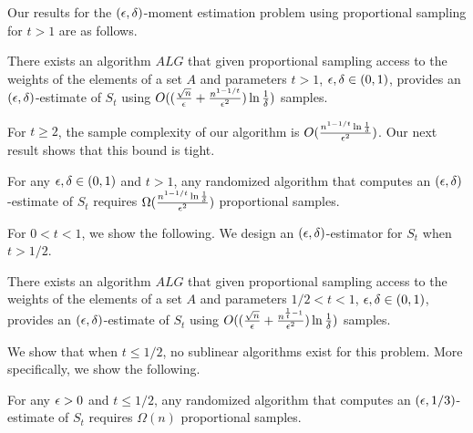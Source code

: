 Our results for the $(\epsilon,\delta)$-moment estimation problem using proportional sampling for $t>1$ are as follows. 

\begin{thm} There exists an algorithm $ALG$ that given proportional sampling access to the weights of the elements of a set $A$ and parameters $t>1$, $\epsilon,\delta\in (0,1)$, provides an $(\epsilon,\delta)$-estimate of $S_t$ using $O((\frac{\sqrt{n}}{\epsilon}+\frac{n^{1-1/t}}{\epsilon^2}) \ln\frac{1}{\delta})$ samples. \end{thm}

For $t\geq 2$, the sample complexity of our algorithm is $O(\frac{n^{1-1/t}\ln\frac{1}{\delta}}{\epsilon^2})$. Our next result shows that this bound is tight.

\begin{thm} For any $\epsilon,\delta\in (0,1)$ and $t>1$, any randomized algorithm that computes an $(\epsilon,\delta)$-estimate of $S_t$ requires $\Omega(\frac{n^{1-1/t}\ln\frac{1}{\delta}}{\epsilon^2})$ proportional samples. \end{thm}

For $0<t<1$, we show the following. We design an $(\epsilon,\delta)$-estimator for $S_t$ when $t>1/2$.

\begin{thm} There exists an algorithm $ALG$ that given proportional sampling access to the weights of the elements of a set $A$ and parameters $1/2<t<1$, $\epsilon,\delta \in (0,1)$, provides an $(\epsilon,\delta)$-estimate of $S_t$ using $O((\frac{\sqrt{n}}{\epsilon}+\frac{n^{\frac{1}{t}-1}}{\epsilon^2})\ln \frac{1}{\delta})$ samples. \end{thm}

We show that when $t\leq 1/2$, no sublinear algorithms exist for this problem. More specifically, we show the following.

\begin{thm} For any $\epsilon>0$ and $t\leq 1/2$, any randomized algorithm that computes an $(\epsilon,1/3)$-estimate of $S_t$ requires $\Omega(n)$ proportional samples. \end{thm}


